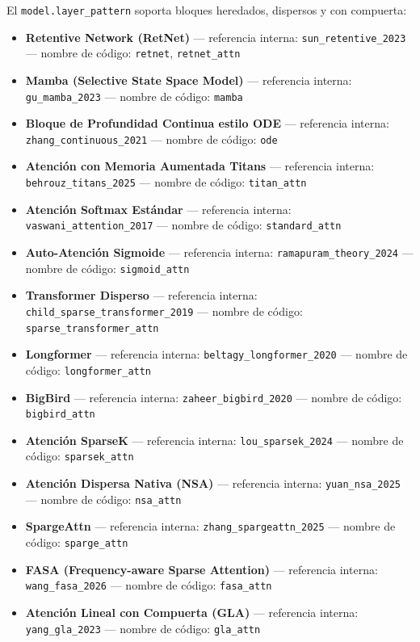 \documentclass[11pt,a4paper]{article}
\begin{document}
El \texttt{model.layer\_pattern} soporta bloques heredados, dispersos y con compuerta:
\begin{itemize}[leftmargin=*]
    \item \textbf{Retentive Network (RetNet)} --- referencia interna: \texttt{sun\_retentive\_2023} --- nombre de código: \texttt{retnet}, \texttt{retnet\_attn}
    \item \textbf{Mamba (Selective State Space Model)} --- referencia interna: \texttt{gu\_mamba\_2023} --- nombre de código: \texttt{mamba}
    \item \textbf{Bloque de Profundidad Continua estilo ODE} --- referencia interna: \texttt{zhang\_continuous\_2021} --- nombre de código: \texttt{ode}
    \item \textbf{Atención con Memoria Aumentada Titans} --- referencia interna: \texttt{behrouz\_titans\_2025} --- nombre de código: \texttt{titan\_attn}
    \item \textbf{Atención Softmax Estándar} --- referencia interna: \texttt{vaswani\_attention\_2017} --- nombre de código: \texttt{standard\_attn}
    \item \textbf{Auto-Atención Sigmoide} --- referencia interna: \texttt{ramapuram\_theory\_2024} --- nombre de código: \texttt{sigmoid\_attn}
    \item \textbf{Transformer Disperso} --- referencia interna: \texttt{child\_sparse\_transformer\_2019} --- nombre de código: \texttt{sparse\_transformer\_attn}
    \item \textbf{Longformer} --- referencia interna: \texttt{beltagy\_longformer\_2020} --- nombre de código: \texttt{longformer\_attn}
    \item \textbf{BigBird} --- referencia interna: \texttt{zaheer\_bigbird\_2020} --- nombre de código: \texttt{bigbird\_attn}
    \item \textbf{Atención SparseK} --- referencia interna: \texttt{lou\_sparsek\_2024} --- nombre de código: \texttt{sparsek\_attn}
    \item \textbf{Atención Dispersa Nativa (NSA)} --- referencia interna: \texttt{yuan\_nsa\_2025} --- nombre de código: \texttt{nsa\_attn}
    \item \textbf{SpargeAttn} --- referencia interna: \texttt{zhang\_spargeattn\_2025} --- nombre de código: \texttt{sparge\_attn}
    \item \textbf{FASA (Frequency-aware Sparse Attention)} --- referencia interna: \texttt{wang\_fasa\_2026} --- nombre de código: \texttt{fasa\_attn}
    \item \textbf{Atención Lineal con Compuerta (GLA)} --- referencia interna: \texttt{yang\_gla\_2023} --- nombre de código: \texttt{gla\_attn}

\end{itemize}
\end{document}
